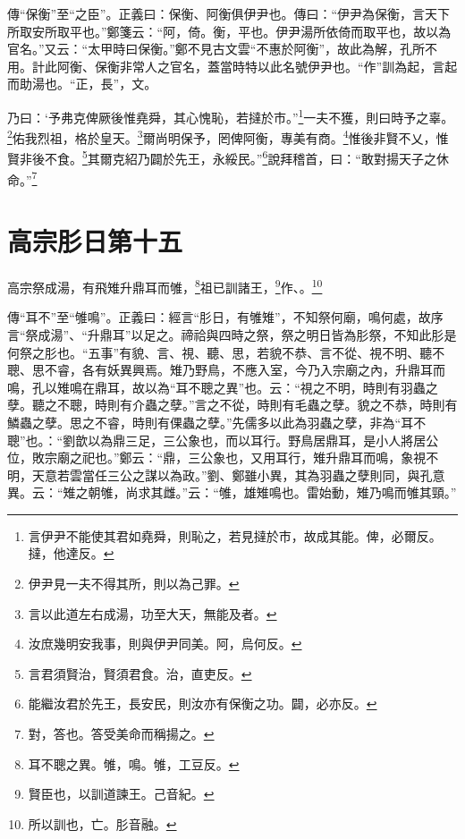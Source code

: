 {\noindent\zhuan{}\fzbyks 傳“保衡”至“之臣”。正義曰：保衡、阿衡俱伊尹也。傳曰：“伊尹為保衡，言天下所取安所取平也。”鄭箋云：“阿，倚。衡，平也。伊尹湯所依倚而取平也，故以為官名。”又云：“太甲時曰保衡。”鄭不見古文雲“不惠於阿衡”，故此為解，孔所不用。計此阿衡、保衡非常人之官名，蓋當時特以此名號伊尹也。“作”訓為起，言起而助湯也。“正，長”，文。 \par}

乃曰：‘予弗克俾厥後惟堯舜，其心愧恥，若撻於市。”\footnote{言伊尹不能使其君如堯舜，則恥之，若見撻於市，故成其能。俾，必爾反。撻，他達反。}一夫不獲，則曰時予之辜。\footnote{伊尹見一夫不得其所，則以為己罪。}佑我烈祖，格於皇天。\footnote{言以此道左右成湯，功至大天，無能及者。}爾尚明保予，罔俾阿衡，專美有商。\footnote{汝庶幾明安我事，則與伊尹同美。阿，烏何反。}惟後非賢不乂，惟賢非後不食。\footnote{言君須賢治，賢須君食。治，直吏反。}其爾克紹乃闢於先王，永綏民。”\footnote{能繼汝君於先王，長安民，則汝亦有保衡之功。闢，必亦反。}說拜稽首，曰：“敢對揚天子之休命。”\footnote{對，答也。答受美命而稱揚之。}

\section{高宗肜日第十五}


高宗祭成湯，有飛雉升鼎耳而雊，\footnote{耳不聰之異。雊，鳴。雊，工豆反。}祖已訓諸王，\footnote{賢臣也，以訓道諫王。己音紀。}作、。\footnote{所以訓也，亡。肜音融。}


{\noindent\zhuan{}\fzbyks 傳“耳不”至“雊鳴”。正義曰：經言“肜日，有雊雉”，不知祭何廟，鳴何處，故序言“祭成湯”、“升鼎耳”以足之。禘祫與四時之祭，祭之明日皆為肜祭，不知此肜是何祭之肜也。“五事”有貌、言、視、聽、思，若貌不恭、言不從、視不明、聽不聰、思不睿，各有妖異興焉。雉乃野鳥，不應入室，今乃入宗廟之內，升鼎耳而鳴，孔以雉鳴在鼎耳，故以為“耳不聰之異”也。云：“視之不明，時則有羽蟲之孽。聽之不聰，時則有介蟲之孽。”言之不從，時則有毛蟲之孽。貌之不恭，時則有鱗蟲之孽。思之不睿，時則有倮蟲之孽。”先儒多以此為羽蟲之孽，非為“耳不聰”也。：“劉歆以為鼎三足，三公象也，而以耳行。野鳥居鼎耳，是小人將居公位，敗宗廟之祀也。”鄭云：“鼎，三公象也，又用耳行，雉升鼎耳而鳴，象視不明，天意若雲當任三公之謀以為政。”劉、鄭雖小異，其為羽蟲之孽則同，與孔意異。云：“雉之朝雊，尚求其雌。”云：“雊，雄雉鳴也。雷始動，雉乃鳴而雊其頸。” \par}

